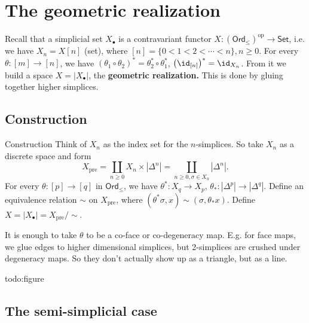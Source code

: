 \section{The geometric realization} 
Recall that a simplicial set $X_{\bullet}$ is a contravariant functor $ X \colon \left( \mathsf{Ord} _{\leq} \right)  ^{\mathrm{op}}\to \mathsf{Set} $, i.e. we have $X_n =X[n]$ (set), where $[n]=\{0<1<2<\cdots <n\} , n\geq 0$. For every $\theta \colon [m] \to [n]$, we have $(\theta_1 \circ \theta_2)^*=\theta_2^* \circ \theta_1^*$, $\left( \id_{[n]} \right) ^*=\id _{X_n }$. From it we build a space $X=|X_{\bullet}|$, the \textbf{geometric realization.} This is done by gluing together higher simplices.

\subsection{Construction}
\begin{namedthm}{Construction} 
Think of $X_n $ as the index set for the $n$-simplices. So take $X_n $ as a discrete space and form \[
X_{\mathrm{pre}}=\coprod _{n\geq 0}X_n \times |\Delta ^n|  = \coprod _{n\geq 0, \sigma \in X_n }|\Delta ^n |.
\] For every $\theta \colon [p] \to [q]$ in $\mathsf{Ord} _{\leq}$, we have $\theta^* \colon X_q \to X_p$, $\theta_* \colon |\Delta ^p| \to |\Delta ^q|$. Define an equivalence relation $\sim$ on $X_{\mathrm{pre}}$, where $(\theta^* \sigma,x) \sim(\sigma, \theta_*x)$. Define $X=|X_{\bullet }|=X _{\mathrm{pre}}/ \sim$.
\end{namedthm}
It is enough to take $\theta$ to be a co-face or co-degeneracy map. E.g. for face maps, we glue edges to higher dimensional simplices, but 2-simplices are crushed under degeneracy maps. So they don't actually show up as a triangle, but as a line.

{\color{red}todo:figure} 

\subsection{The semi-simplicial case}

